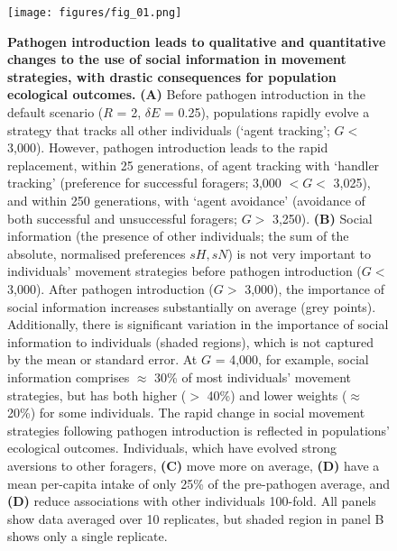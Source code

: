 \begin{figure}[!t]
    \centering
    \texttt{[image: figures/fig\_01.png]}
    \caption{
        \textbf{Pathogen introduction leads to qualitative and quantitative changes to the use of social information in movement strategies, with drastic consequences for population ecological outcomes.}
        \textbf{(A)} Before pathogen introduction in the default scenario ($R$ = 2, $\delta E$ = 0.25), populations rapidly evolve a strategy that tracks all other individuals (`agent tracking'; $G <$ 3,000).
        However, pathogen introduction leads to the rapid replacement, within 25 generations, of agent tracking with `handler tracking' (preference for successful foragers; 3,000 $< G <$ 3,025), and within 250 generations, with `agent avoidance' (avoidance of both successful and unsuccessful foragers; $G >$ 3,250).
        \textbf{(B)} Social information (the presence of other individuals; the sum of the absolute, normalised preferences $sH, sN$) is not very important to individuals' movement strategies before pathogen introduction ($G <$ 3,000).
        After pathogen introduction ($G >$ 3,000), the importance of social information increases substantially on average (grey points).
        Additionally, there is significant variation in the importance of social information to individuals (shaded regions), which is not captured by the mean or standard error.
        At $G$ = 4,000, for example, social information comprises $\approx$ 30\% of most individuals' movement strategies, but has both higher ($>$ 40\%) and lower weights ($\approx$ 20\%) for some individuals.
        The rapid change in social movement strategies following pathogen introduction is reflected in populations' ecological outcomes.
        Individuals, which have evolved strong aversions to other foragers, \textbf{(C)} move more on average, \textbf{(D)} have a mean per-capita intake of only 25\% of the pre-pathogen average, and \textbf{(D)} reduce associations with other individuals 100-fold.
        All panels show data averaged over 10 replicates, but shaded region in panel B shows only a single replicate.
    }
    \label{fig1}
\end{figure}


